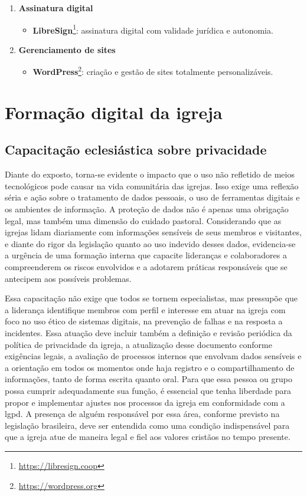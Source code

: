 \begin{enumerate}
    \item \textbf{Assinatura digital}
    \begin{itemize}
        \item \textbf{LibreSign}\footnote{\url{https://libresign.coop}}: assinatura digital com validade jurídica e autonomia.
    \end{itemize}

    \item \textbf{Gerenciamento de sites}
    \begin{itemize}
        \item \textbf{WordPress}\footnote{\url{https://wordpress.org}}: criação e gestão de sites totalmente personalizáveis.
    \end{itemize}
\end{enumerate}

\section{Formação digital da igreja}

\subsection{Capacitação eclesiástica sobre privacidade}

Diante do exposto, torna-se evidente o impacto que o uso não refletido de meios tecnológicos pode causar na vida comunitária das igrejas. Isso exige uma reflexão séria e ação sobre o tratamento de dados pessoais, o uso de ferramentas digitais e os ambientes de informação. A proteção de dados não é apenas uma obrigação legal, mas também uma dimensão do cuidado pastoral. Considerando que as igrejas lidam diariamente com informações sensíveis de seus membros e visitantes, e diante do rigor da legislação quanto ao uso indevido desses dados, evidencia-se a urgência de uma formação interna que capacite lideranças e colaboradores a compreenderem os riscos envolvidos e a adotarem práticas responsáveis que se antecipem aos possíveis problemas.

Essa capacitação não exige que todos se tornem especialistas, mas pressupõe que a liderança identifique membros com perfil e interesse em atuar na igreja com foco no uso ético de sistemas digitais, na prevenção de falhas e na resposta a incidentes. Essa atuação deve incluir também a definição e revisão periódica da política de privacidade da igreja, a atualização desse documento conforme exigências legais, a avaliação de processos internos que envolvam dados sensíveis e a orientação em todos os momentos onde haja registro e o compartilhamento de informações, tanto de forma escrita quanto oral. Para que essa pessoa ou grupo possa cumprir adequadamente sua função, é essencial que tenha liberdade para propor e implementar ajustes nos processos da igreja em conformidade com a \gls{lgpd}. A presença de alguém responsável por essa área, conforme previsto na legislação brasileira, deve ser entendida como uma condição indispensável para que a igreja atue de maneira legal e fiel aos valores cristãos no tempo presente.

